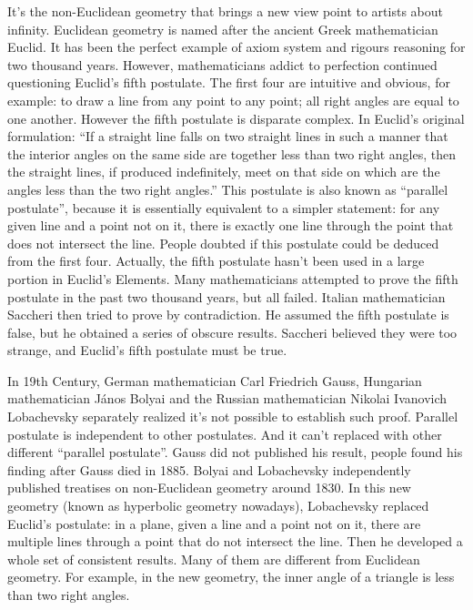 \documentclass{article}
\begin{document}
It's the non-Euclidean geometry that brings a new view point to artists about infinity. Euclidean geometry is named after the ancient Greek mathematician Euclid. It has been the perfect example of axiom system and rigours reasoning for two thousand years. However, mathematicians addict to perfection continued questioning Euclid's fifth postulate. The first four are intuitive and obvious, for example: to draw a line from any point to any point; all right angles are equal to one another. However the fifth postulate is disparate complex. In Euclid's original formulation: ``If a straight line falls on two straight lines in such a manner that the interior angles on the same side are together less than two right angles, then the straight lines, if produced indefinitely, meet on that side on which are the angles less than the two right angles.'' This postulate is also known as ``parallel postulate'', because it is essentially equivalent to a simpler statement: for any given line and a point not on it, there is exactly one line through the point that does not intersect the line. People doubted if this postulate could be deduced from the first four. Actually, the fifth postulate hasn't been used in a large portion in Euclid's Elements. Many mathematicians attempted to prove the fifth postulate in the past two thousand years, but all failed. Italian mathematician Saccheri then tried to prove by contradiction. He assumed the fifth postulate is false, but he obtained a series of obscure results. Saccheri believed they were too strange, and Euclid's fifth postulate must be true.

In 19th Century, German mathematician Carl Friedrich Gauss, Hungarian mathematician János Bolyai and the Russian mathematician Nikolai Ivanovich Lobachevsky separately realized it's not possible to establish such proof. Parallel postulate is independent to other postulates. And it can't replaced with other different ``parallel postulate''. Gauss did not published his result, people found his finding after Gauss died in 1885. Bolyai and Lobachevsky independently published treatises on non-Euclidean geometry around 1830. In this new geometry (known as hyperbolic geometry nowadays), Lobachevsky replaced Euclid's postulate: in a plane, given a line and a point not on it, there are multiple lines through a point that do not intersect the line. Then he developed a whole set of consistent results. Many of them are different from Euclidean geometry. For example, in the new geometry, the inner angle of a triangle is less than two right angles.
\end{document}
